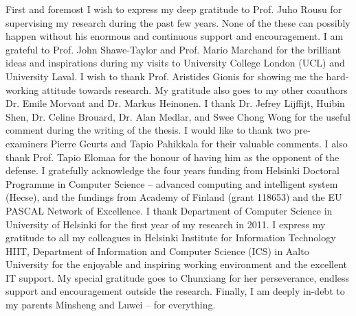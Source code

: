 

\begin{preface}[Espoo]

%
First and foremost I wish to express my deep gratitude to Prof. Juho Rousu for supervising my research during the past few years.
None of the these can possibly happen without his enormous and continuous support and encouragement.
%
I am grateful to Prof. John Shawe-Taylor and Prof. Mario Marchand for the brilliant ideas and inspirations during my visits to University College London (UCL) and University Laval.
%
I wish to thank Prof. Aristides Gionis for showing me the hard-working attitude towards research.
My gratitude also goes to my other coauthors Dr. Emile Morvant and Dr. Markus Heinonen. 
%
I thank Dr. Jefrey Lijffijt, Huibin Shen, Dr. Celine Brouard, Dr. Alan Medlar, and Swee Chong Wong for the useful comment during the writing of the thesis.
I would like to thank two pre-examiners Pierre Geurts and Tapio Pahikkala for their valuable comments.
I also thank Prof. Tapio Elomaa for the honour of having him as the opponent of the defense.
%
I gratefully acknowledge the four years funding from Helsinki Doctoral Programme in Computer Science -- advanced computing and intelligent system (Hecse), and the fundings from Academy of Finland (grant 118653) and the EU PASCAL Network of Excellence.
% 
I thank Department of Computer Science in University of Helsinki for the first year of my research in 2011.
I express my gratitude to all my colleagues in Helsinki Institute for Information Technology HIIT, Department of Information and Computer Science (ICS) in Aalto University for the enjoyable and inspiring working environment and the excellent IT support.
%
My special gratitude goes to Chunxiang for her perseverance, endless support and encouragement outside the research.
%
Finally, I am deeply in-debt to my parents Minsheng and Luwei -- for everything.










\end{preface}
